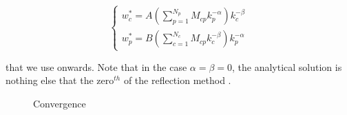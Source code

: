 \begin{equation}
\begin{cases}
 w^*_c = A(\sum^{N_p}_{p=1} M_{cp}k_p^{-\alpha})k_c^{-\beta} \\
w^*_p = B(\sum^{N_c}_{c=1} M_{cp}k_c^{-\beta})k_p^{-\alpha}
\end{cases}
\end{equation}

that we use onwards. Note that in the case $\alpha = \beta = 0$, the analytical solution is nothing else that the zero$^{th}$ of the reflection method \cite{}.




\begin{figure}[!t]
\centering
\caption{Convergence}
\label{fig:convergence}
\end{figure}